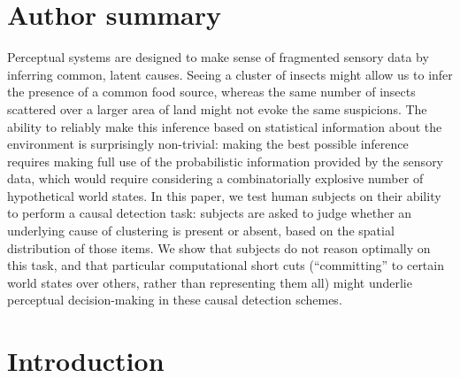 \documentclass{article}
\begin{document}

\section*{Author summary}
Perceptual systems are designed to make sense of fragmented sensory data by inferring common, latent causes. Seeing a cluster of insects might allow us to infer the presence of a common food source, whereas the same number of insects scattered over a larger area of land might not evoke the same suspicions. The ability to reliably make this inference based on statistical information about the environment is surprisingly non-trivial: making the best possible inference requires making full use of the probabilistic information provided by the sensory data, which would require considering a combinatorially explosive number of hypothetical world states. In this paper, we test human subjects on their ability to perform a causal detection task: subjects are asked to judge whether an underlying cause of clustering is present or absent, based on the spatial distribution of those items. We show that subjects do not reason optimally on this task, and that particular computational short cuts (``committing'' to certain world states over others, rather than representing them all) might underlie perceptual decision-making in these causal detection schemes.

\section*{Introduction}
\end{document}
